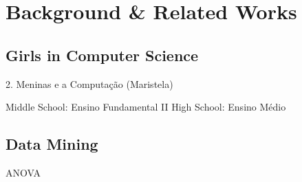 \section{Background \& Related Works}\label{sec:background}%

\subsection{Girls in Computer Science}\label{subsec:girls}%
2. Meninas e a Computação (Maristela)

Middle School: Ensino Fundamental II
High School: Ensino Médio

\subsection{Data Mining}\label{subsec:mining}%
%
ANOVA ~\cite{Hastie2009}

%


